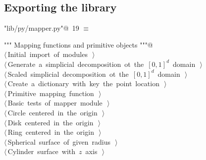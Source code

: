 \documentclass[11pt,oneside]{article}	%
\begin{document}
\subsection{Exporting the library}
\begin{flushleft} \small \label{scrap36}
\protect{}\verb@"lib/py/mapper.py"@\nobreak\ {\footnotesize 19 }$\equiv$
\vspace{-1ex}
\begin{list}{}{} \item
\mbox{}\verb@""" Mapping functions and primitive objects """@\\
\mbox{}\verb@@\hbox{$\langle\,$Initial import of modules\nobreak\ {\footnotesize {}}$\,\rangle$}\verb@@\\
\mbox{}\verb@@\hbox{$\langle\,$Generate a simplicial decomposition ot the $[0,1]^d$ domain\nobreak\ {\footnotesize {}}$\,\rangle$}\verb@@\\
\mbox{}\verb@@\hbox{$\langle\,$Scaled simplicial decomposition ot the $[0,1]^d$ domain\nobreak\ {\footnotesize {}}$\,\rangle$}\verb@@\\
\mbox{}\verb@@\hbox{$\langle\,$Create a dictionary with key the point location\nobreak\ {\footnotesize {}}$\,\rangle$}\verb@@\\
\mbox{}\verb@@\hbox{$\langle\,$Primitive mapping function\nobreak\ {\footnotesize {}}$\,\rangle$}\verb@@\\
\mbox{}\verb@@\hbox{$\langle\,$Basic tests of mapper module\nobreak\ {\footnotesize {}}$\,\rangle$}\verb@@\\
\mbox{}\verb@@\hbox{$\langle\,$Circle centered in the origin\nobreak\ {\footnotesize {}}$\,\rangle$}\verb@@\\
\mbox{}\verb@@\hbox{$\langle\,$Disk centered in the origin\nobreak\ {\footnotesize {}}$\,\rangle$}\verb@@\\
\mbox{}\verb@@\hbox{$\langle\,$Ring centered in the origin\nobreak\ {\footnotesize {}}$\,\rangle$}\verb@@\\
\mbox{}\verb@@\hbox{$\langle\,$Spherical surface of given radius\nobreak\ {\footnotesize {}}$\,\rangle$}\verb@@\\
\mbox{}\verb@@\hbox{$\langle\,$Cylinder surface with $z$ axis\nobreak\ {\footnotesize {}}$\,\rangle$}\verb@@\\

\end{list}
\end{flushleft}
\end{document}
